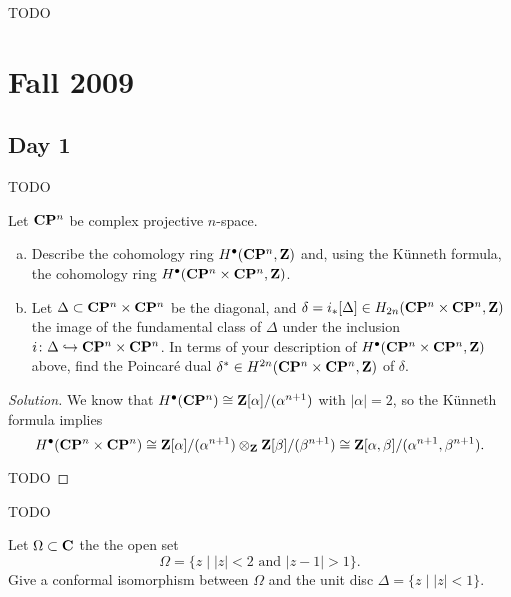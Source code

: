 TODO

\section{Fall 2009}
\label{S:fall-2009}

\subsection{Day 1}
\label{S:fall-2009-1}
\mbox{}


TODO


Let $\mathbf{C}\mathbf{P}^n$ be complex projective $n$-space.
\begin{enumerate}[(a)]
\item Describe the cohomology ring $H^\bullet(\mathbf{C}\mathbf{P}^n, \mathbf{Z})$ and, using the K\"unneth formula, the cohomology ring $H^\bullet(\mathbf{C}\mathbf{P}^n \times \mathbf{C}\mathbf{P}^n, \mathbf{Z})$.
\item Let $\Delta \subset \mathbf{C}\mathbf{P}^n \times \mathbf{C}\mathbf{P}^n$ be the diagonal, and $\delta = i_\ast[\Delta] \in H_{2n}(\mathbf{C}\mathbf{P}^n \times \mathbf{C}\mathbf{P}^n, \mathbf{Z})$ the image of the fundamental class of $\Delta$ under the inclusion $i \colon \Delta \hookrightarrow \mathbf{C}\mathbf{P}^n \times \mathbf{C}\mathbf{P}^n$. In terms of your description of $H^\bullet(\mathbf{C}\mathbf{P}^n \times \mathbf{C}\mathbf{P}^n, \mathbf{Z})$ above, find the Poincar\'e dual $\delta^\ast \in H^{2n}(\mathbf{C}\mathbf{P}^n \times \mathbf{C}\mathbf{P}^n, \mathbf{Z})$ of $\delta$.
\end{enumerate}

\begin{proof}[Solution]
  We know that $H^\bullet(\mathbf{C}\mathbf{P}^n) \cong \mathbf{Z}[\alpha]/(\alpha^{n+1})$ with $|\alpha| = 2$, so the K\"unneth formula implies
  \[
  H^\bullet(\mathbf{C}\mathbf{P}^n \times \mathbf{C}\mathbf{P}^n) \cong
  \mathbf{Z}[\alpha]/(\alpha^{n+1}) \otimes_{\mathbf{Z}} \mathbf{Z}[\beta]/(\beta^{n+1}) \cong
  \mathbf{Z}[\alpha,\beta]/(\alpha^{n+1},\beta^{n+1}).
  \]
  
  TODO
\end{proof}


TODO


Let $\Omega \subset \mathbf{C}$ the the open set
\[
\Omega = \{ z \;|\; |z| < 2 \textrm{ and } |z-1| > 1 \}.
\]
Give a conformal isomorphism between $\Omega$ and the unit disc $\Delta = \{ z \;|\; |z| < 1 \}$.

